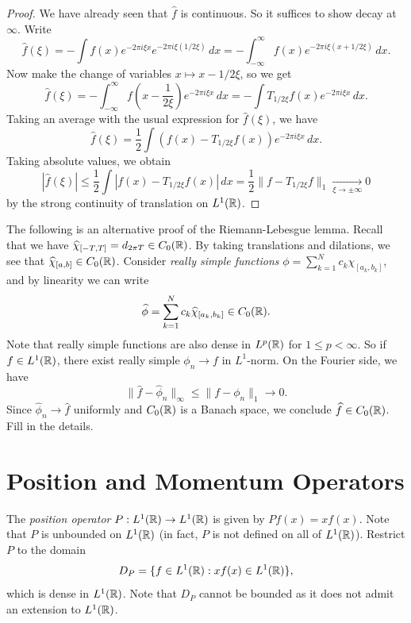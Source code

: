 \begin{proof}
  We have already seen that $\widehat{f}$
  is continuous. So it
  suffices to show decay at $\infty$.
  Write
  \[
    \widehat{f}(\xi)
    = - \int f(x) e^{-2\pi i \xi x}
    e^{-2\pi i \xi (1 / 2\xi)}\, dx
    = -\int_{-\infty}^\infty f(x) e^{-2\pi i \xi (x + 1 / 2\xi)}\, dx.
  \]
  Now make the change of variables
  $x \mapsto x - 1 / 2\xi$, so we get
  \[
    \widehat{f}(\xi)
    = - \int_{-\infty}^\infty f\left(x - \frac{1}{2\xi}\right) e^{-2\pi i \xi x}\, dx
    = - \int T_{1 / 2\xi} f(x) e^{-2\pi i \xi x}\, dx.
  \]
  Taking an average with the usual
  expression for $\widehat{f}(\xi)$, we
  have
  \[
    \widehat{f}(\xi)
    = \frac{1}{2} \int (f(x) - T_{1 / 2\xi} f(x)) e^{-2\pi i \xi x}\, dx.
  \]
  Taking absolute values, we obtain
  \[
    |\widehat{f}(\xi)|
    \le \frac{1}{2} \int |f(x) - T_{1 / 2\xi} f(x)|\, dx
    = \frac{1}{2} \|f - T_{1 / 2\xi} f\|_1
    \xrightarrow[\xi \to \pm \infty]{}
    0
  \]
  by the strong continuity of translation
  on $L^1(\mathbb{R})$.
\end{proof}

\begin{exercise}
  The following is an alternative proof
  of the Riemann-Lebesgue lemma.
  Recall that we have $\widehat{\chi}_{[-T, T]} = d_{2\pi T} \in C_0(\mathbb{R})$.
  By taking translations and dilations, we
  see that $\widehat{\chi}_{[a, b]} \in C_0(\mathbb{R})$.
  Consider \emph{really simple functions}
  $\phi = \sum_{k = 1}^N c_k \chi_{[a_k, b_k]}$,
  and by linearity we can write
  \[
    \widehat{\phi}
    = \sum_{k = 1}^N c_k \widehat{\chi}_{[a_k, b_k]} \in C_0(\mathbb{R}).
  \]
  Note that really simple functions are also
  dense in $L^p(\mathbb{R})$ for $1 \le p < \infty$.
  So if $f \in L^1(\mathbb{R})$, there exist
  really simple $\phi_n \to f$ in $L^1$-norm.
  On the Fourier side, we have
  \[
    \|\widehat{f} - \widehat{\phi}_n\|_\infty
    \le \|f - \phi_n\|_1 \longrightarrow 0.
  \]
  Since $\widehat{\phi}_n \to \widehat{f}$ uniformly
  and $C_0(\mathbb{R})$ is a Banach space,
  we conclude $\widehat{f} \in C_0(\mathbb{R})$.
  Fill in the details.
\end{exercise}

\section{Position and Momentum Operators}

\begin{definition}
  The \emph{position operator} $P : L^1(\mathbb{R}) \to L^1(\mathbb{R})$ is
  given by $P f(x) = x f(x)$.
  Note that $P$ is unbounded on $L^1(\mathbb{R})$
  (in fact, $P$ is not defined on all
  of $L^1(\mathbb{R})$).
  Restrict $P$ to the domain
  \[
    D_P = \{f \in L^1(\mathbb{R}) : xf(x) \in L^1(\mathbb{R})\},
  \]
  which is dense in $L^1(\mathbb{R})$.
  Note that $D_P$ cannot be bounded
  as it does not admit an extension
  to $L^1(\mathbb{R})$.
\end{definition}

